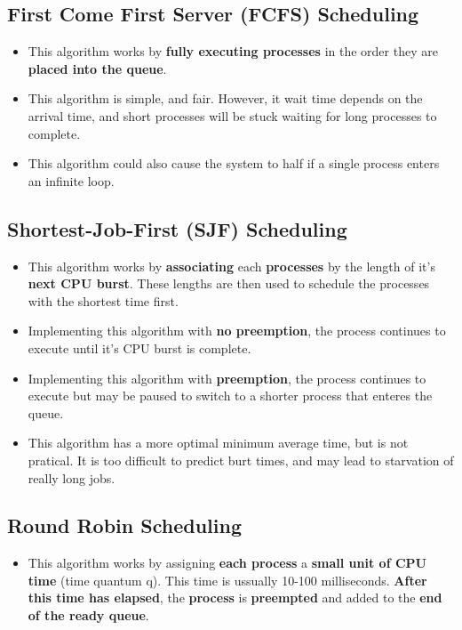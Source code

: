 \documentclass{article}
\begin{document}
    \subsection*{First Come First Server (FCFS) Scheduling}
    \begin{itemize}
        \item This algorithm works by \textbf{fully executing processes} in the order they are \textbf{placed into the queue}.
        \item This algorithm is simple, and fair. However, it wait time depends on the arrival time, and short processes will be stuck waiting for long processes to complete.
        \item This algorithm could also cause the system to half if a single process enters an infinite loop.
    \end{itemize}

    \subsection*{Shortest-Job-First (SJF) Scheduling}
    \begin{itemize}
        \item This algorithm works by \textbf{associating} each \textbf{processes} by the length of it's \textbf{next CPU burst}. These lengths are then used to schedule the processes with the shortest time first.
        \item Implementing this algorithm with \textbf{no preemption}, the process continues to execute until it's CPU burst is complete.
        \item Implementing this algorithm with \textbf{preemption}, the process continues to execute but may be paused to switch to a shorter process that enteres the queue.
        \item This algorithm has a more optimal minimum average time, but is not pratical. It is too difficult to predict burt times, and may lead to starvation of really long jobs.
    \end{itemize}

    \subsection*{Round Robin Scheduling}
    \begin{itemize}
        \item This algorithm works by assigning \textbf{each process} a \textbf{small unit of CPU time} (time quantum q). This time is ussually 10-100 milliseconds. \textbf{After this time has elapsed}, the \textbf{process} is \textbf{preempted} and added to the \textbf{end of the ready queue}.
    \end{itemize}
\end{document}

